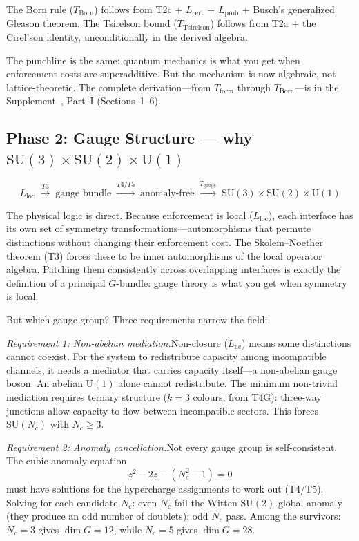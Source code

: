 \documentclass[11pt]{article}
\newcommand{\SU}{\mathrm{SU}}
\newcommand{\U}{\mathrm{U}}
\begin{document}
The Born rule ($T_{\mathrm{Born}}$) follows from T2c $+$ $L_{\mathrm{cert}}$ $+$ $L_{\mathrm{prob}}$ $+$ Busch's generalized Gleason theorem.  The Tsirelson bound ($T_{\mathrm{Tsirelson}}$) follows from T2a $+$ the Cirel'son identity, unconditionally in the derived algebra.

The punchline is the same: quantum mechanics is what you get when enforcement costs are superadditive.  But the mechanism is now algebraic, not lattice-theoretic.  The complete derivation---from $T_{\mathrm{form}}$ through $T_{\mathrm{Born}}$---is in the Supplement~\cite{Supp}, Part~I (Sections~1--6).


\subsection{Phase 2: Gauge Structure --- why \texorpdfstring{$\SU(3)\times\SU(2)\times\U(1)$}{SU(3)×SU(2)×U(1)}}

\begin{equation}
L_{\mathrm{loc}} \;\xrightarrow{T3}\; \text{gauge bundle} \;\xrightarrow{T4/T5}\; \text{anomaly-free} \;\xrightarrow{T_{\mathrm{gauge}}}\; \SU(3)\times\SU(2)\times\U(1)
\end{equation}

The physical logic is direct.  Because enforcement is local ($L_{\mathrm{loc}}$), each interface has its own set of symmetry transformations---automorphisms that permute distinctions without changing their enforcement cost.  The Skolem--Noether theorem (T3) forces these to be inner automorphisms of the local operator algebra.  Patching them consistently across overlapping interfaces is exactly the definition of a principal $G$-bundle: gauge theory is what you get when symmetry is local.

But which gauge group?  Three requirements narrow the field:

\textit{Requirement 1: Non-abelian mediation.}\quad Non-closure ($L_{\mathrm{nc}}$) means some distinctions cannot coexist.  For the system to redistribute capacity among incompatible channels, it needs a mediator that carries capacity itself---a non-abelian gauge boson.  An abelian $\U(1)$ alone cannot redistribute.  The minimum non-trivial mediation requires ternary structure ($k=3$ colours, from T4G): three-way junctions allow capacity to flow between incompatible sectors.  This forces $\SU(N_c)$ with $N_c \ge 3$.

\textit{Requirement 2: Anomaly cancellation.}\quad Not every gauge group is self-consistent.  The cubic anomaly equation
\begin{equation}
z^2 - 2z - (N_c^2 - 1) = 0
\end{equation}
must have solutions for the hypercharge assignments to work out (T4/T5).  Solving for each candidate $N_c$: even $N_c$ fail the Witten $\SU(2)$ global anomaly (they produce an odd number of doublets); odd $N_c$ pass.  Among the survivors: $N_c = 3$ gives $\dim G = 12$, while $N_c = 5$ gives $\dim G = 28$.
\end{document}
